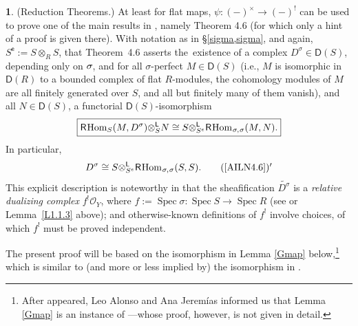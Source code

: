 \documentclass{compositio}
\theoremstyle{plain}
\theoremstyle{definition}
\newtheorem{cosa}[thm]{}
\theoremstyle{remark}
\numberwithin{equation}{thm}
\begin{document}
\begin{cosa} (Reduction Theorems.) At least for flat maps, $\psi\colon(-)^\times\to(-)^!$ can be used to prove one of the main
results in \cite{AILN}, namely Theorem 4.6 (for which only a hint of a proof is given there). With notation as in \S\ref{sigma,sigma},  and again, ${{S}^{\mathsf e}}{\!:=} S\otimes_R S$, that Theorem~4.6 asserts the~existence of a complex $D^\sigma\in{\boldsymbol{\mathsf{D}}}(S)$, depending only on $\sigma{\mkern-1mu}$, and
for all $\sigma$-perfect $M\in{\boldsymbol{\mathsf{D}}}(S)$ (i.e., $M$ is isomorphic in ${\boldsymbol{\mathsf{D}}}(R)$ to a bounded complex of flat $R$-modules, the cohomology modules of $M$ are all finitely generated over $S$, and all but finitely many of them vanish), and all $N\in{\boldsymbol{\mathsf{D}}}(S)$, a functorial ${\boldsymbol{\mathsf{D}}}(S)$-isomorphism{\vspace{4pt}} 
\begin{equation}\label{AILN4.6}
\boxed{{\mathsf R}{\mkern-1mu}{\mkern-1mu}\operatorname{Hom}_S(M, D^\sigma){\otimes^{\mathsf L}_{{S}}} N \cong S{\otimes^{\mathsf L}_{{S^e}}}{\mathsf R}{\mkern-1mu}{\mkern-1mu}\operatorname{Hom}_{{\mkern1mu}\sigma{\mkern-1mu},{\mkern1mu}\sigma}(M,N).}
\end{equation}
In particular,
\begin{equation*}\label{affreldual}
D^\sigma\cong S{\otimes^{\mathsf L}_{{S^e}}}{\mathsf R}{\mkern-1mu}{\mkern-1mu}\operatorname{Hom}_{{\mkern1mu}\sigma{\mkern-1mu},{\mkern1mu}\sigma}(S,S).\tag*{(\ref{AILN4.6})$'$}
\end{equation*}
This explicit description is noteworthy in that  the sheafification \mbox{$\widetilde{D^\sigma}$}
is a \emph{relative dualizing complex} $f^!{\mathcal O_Y}$, where 
$f{\!:=}\operatorname{Spec}\sigma\colon \operatorname{Spec} S\to \operatorname{Spec} R$ (see \cite[Example 2.3.2]{AIL}
or Lemma~\ref{L1.1.3} above); and otherwise-known definitions of $f^!$ involve choices, of which $f^!$ must be proved independent.{\vspace{2pt}}

The present proof will be based on the isomorphism in Lemma \eqref{Gmap} below,\footnote{After \cite{AILN} appeared, Leo Alonso and Ana Jerem\'ias informed us that Lemma  \eqref{Gmap} is an instance of \cite[p.\,123, (6.4.2)]{SGA5}---whose proof, however, is
not given in detail.}
which is similar to (and more or less implied by) the isomorphism in \cite[6.6]{AILN}.{\vspace{2pt}}


\end{cosa}
\end{document}
